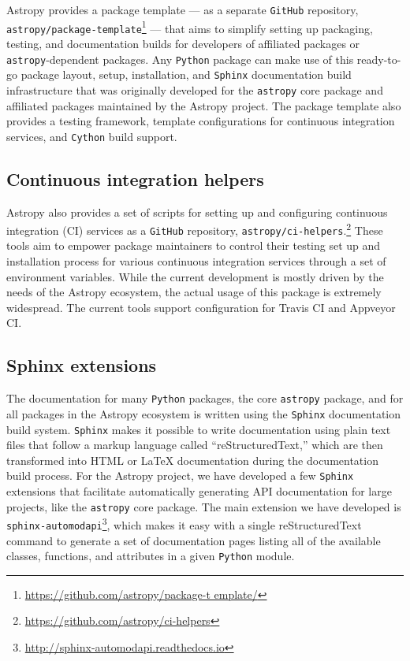 \documentclass[modern]{aastex61}
\newcommand{\package}[1]{\texttt{#1}\xspace}
\newcommand{\github}{\package{GitHub}}
\newcommand{\python}{\package{Python}}
\newcommand{\astropy}{Astropy\xspace}
\newcommand{\astropypkg}{\package{astropy}}
\begin{document}
\astropy provides a package template --- as a separate \github repository,
\package{astropy/package-template}\footnote{\url{https://github.com/astropy/package-t
emplate/}} --- that aims to simplify setting up packaging, testing, and
documentation builds for developers of affiliated packages or
\astropypkg-dependent packages.
Any \python package can make use of this ready-to-go package layout, setup,
installation, and \package{Sphinx} documentation build infrastructure that was
originally developed for the \astropypkg core package and affiliated packages
maintained by the \astropy project.
The package template also provides a testing framework, template configurations
for continuous integration services, and \package{Cython} build support.

\subsection{Continuous integration helpers}

\astropy also provides a set of scripts for setting up and configuring
continuous integration (CI) services as a \github repository,
\package{astropy/ci-helpers}.\footnote{\url{https://github.com/astropy/ci-helpers}}
These tools aim to empower package maintainers to control their testing set up
and installation process for various continuous integration services through a
set of environment variables.
While the current development is mostly driven by the needs of the \astropy
ecosystem, the actual usage of this package is extremely widespread. The current
tools support configuration for Travis CI and Appveyor CI.

\subsection{Sphinx extensions}

The documentation for many \python packages, the core \astropypkg package, and
for all packages in the \astropy ecosystem is written using the
\package{Sphinx} documentation build system.
\package{Sphinx} makes it possible to write documentation using plain text files
that follow a markup language called ``reStructuredText,'' which are then
transformed into HTML or \LaTeX{} documentation during the documentation build
process.
For the \astropy project, we have developed a few \package{Sphinx} extensions
that facilitate automatically generating API documentation for large projects,
like the \astropypkg core package.
The main extension we have developed is
\package{sphinx-automodapi}\footnote{\url{http://sphinx-automodapi.readthedocs.io}},
which makes it easy with a single reStructuredText command to generate a set of
documentation pages listing all of the available classes, functions, and
attributes in a given \python module.
\end{document}
